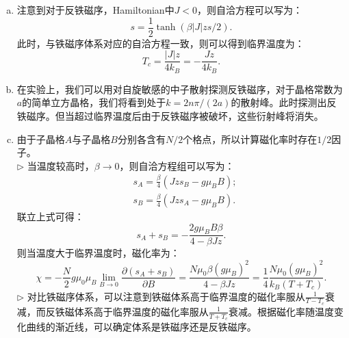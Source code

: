 \documentclass[reqno,a4paper,12pt]{amsart}
\begin{document}
\begin{enumerate}[1.]
\begin{tcolorbox}[breakable, colframe = black, colback = black!5!white]
\begin{enumerate}[(a)]
\item 注意到对于反铁磁序，Hamiltonian中$J<0$，则自洽方程可以写为：
\[
	s = \frac{1}{2} \tanh(\beta \vert J \vert zs/2).
\]
此时，与铁磁序体系对应的自洽方程一致，则可以得到临界温度为：
\[
	T_c = \frac{\vert J \vert z}{4k_B} = -\frac{Jz}{4k_B}.
\]

\item 在实验上，我们可以用对自旋敏感的中子散射探测反铁磁序，对于晶格常数为$a$的简单立方晶格，我们将看到处于$k = 2n\pi/(2a)$的散射峰。此时探测出反铁磁序。但当超过临界温度后由于反铁磁序被破坏，这些衍射峰将消失。

\item 由于子晶格$A$与子晶格$B$分别各含有$N/2$个格点，所以计算磁化率时存在$1/2$因子。 \\
$\triangleright$ 当温度较高时，$\beta \to 0$，则自洽方程组可以写为：
\begin{align*}
	&s_A = \frac{\beta}{4}(Jzs_B - g\mu_BB); \\
	&s_B = \frac{\beta}{4}(Jzs_A - g\mu_BB).
\end{align*}
联立上式可得：
\[
	s_A + s_B = -\frac{2g\mu_BB\beta}{4-\beta Jz}.
\]
则当温度大于临界温度时，磁化率为：
\[
	\chi = -\frac{N}{2}g\mu_0\mu_B \lim_{B\to 0} \frac{\partial (s_A+s_B)}{\partial B} = \frac{N\mu_0\beta(g\mu_B)^2}{4-\beta Jz} = \frac{1}{4} \frac{N\mu_0(g\mu_B)^2}{k_B(T+T_c)}.
\]
$\triangleright$ 对比铁磁序体系，可以注意到铁磁体系高于临界温度的磁化率服从$\frac{1}{T-T_c}$衰减，而反铁磁体系高于临界温度的磁化率服从$\frac{1}{T+T_c}$衰减。根据磁化率随温度变化曲线的渐近线，可以确定体系是铁磁序还是反铁磁序。 


\end{enumerate}
\end{tcolorbox}
\end{enumerate}
\end{document}
